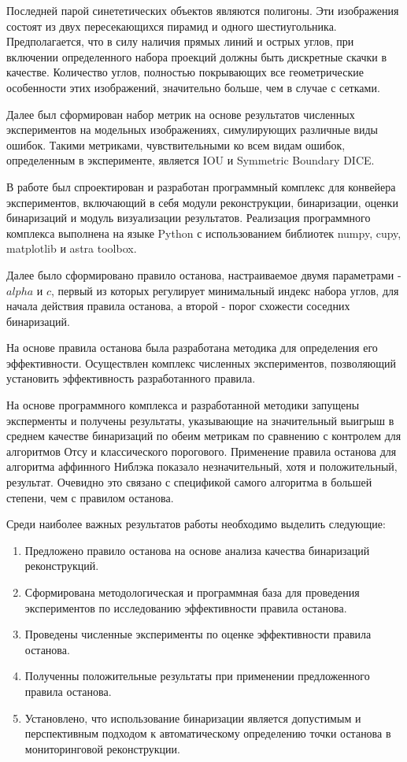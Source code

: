 Последней парой синететических объектов являются полигоны. Эти изображения состоят из двух пересекающихся пирамид и одного шестиугольника. Предполагается, что в силу наличия прямых линий и острых углов, при включении определенного набора проекций должны быть дискретные скачки в качестве.
Количество углов, полностью покрывающих все геометрические особенности этих изображений, значительно больше, чем в случае с сетками.

Далее был сформирован набор метрик на основе результатов численных экспериментов на модельных изображениях, симулирующих различные виды ошибок. Такими метриками, чувствительными ко всем видам ошибок, определенным в эксперименте, является IOU и Symmetric Boundary DICE.

В работе был спроектирован и разработан программный комплекс для конвейера экспериментов, включающий в себя модули реконструкции, бинаризации, оценки бинаризаций и модуль визуализации результатов. Реализация программного комплекса выполнена на языке Python с использованием библиотек numpy, cupy, matplotlib и astra toolbox.

Далее было сформировано правило останова, настраиваемое двумя параметрами - \(alpha\) и \(c\), первый из которых регулирует минимальный индекс набора углов, для начала действия правила останова, а второй - порог схожести соседних бинаризаций.

На основе правила останова была разработана методика для определения его эффективности. Осуществлен комплекс численных экспериментов, позволяющий установить эффективность разработанного правила.

На основе программного комплекса и разработанной методики запущены эксперменты и получены результаты, указывающие на значительный выигрыш в среднем качестве бинаризаций по обеим метрикам по сравнению с контролем для алгоритмов Отсу и классического порогового. Применение правила останова для алгоритма аффинного Ниблэка показало незначительный, хотя и положительный, результат. Очевидно это связано с спецификой самого алгоритма в большей степени, чем с правилом останова.

Среди наиболее важных результатов работы необходимо выделить следующие:
\begin{enumerate}
    \item Предложено правило останова на основе анализа качества бинаризаций реконструкций.
    \item Сформирована методологическая и программная база для проведения экспериментов по исследованию эффективности правила останова.
    \item Проведены численные эксперименты по оценке эффективности правила останова.
    \item Полученны положительные результаты при применении предложенного правила останова.
    \item Установлено, что использование бинаризации является допустимым и перспективным подходом к автоматическому определению точки останова в мониторинговой реконструкции.
\end{enumerate}

